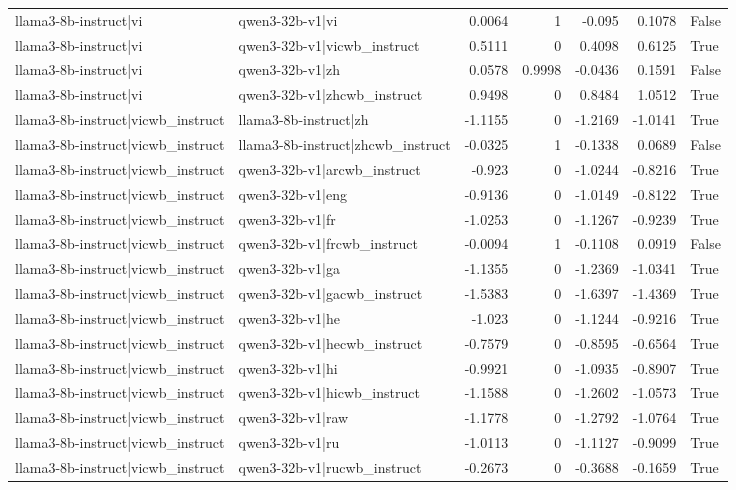 \begin{table}
\begin{tabular}{l l r r r r l}
llama3-8b-instruct|vi & qwen3-32b-v1|vi & 0.0064 & 1 & -0.095 & 0.1078 & False \\
llama3-8b-instruct|vi & qwen3-32b-v1|vicwb_instruct & 0.5111 & 0 & 0.4098 & 0.6125 & True \\
llama3-8b-instruct|vi & qwen3-32b-v1|zh & 0.0578 & 0.9998 & -0.0436 & 0.1591 & False \\
llama3-8b-instruct|vi & qwen3-32b-v1|zhcwb_instruct & 0.9498 & 0 & 0.8484 & 1.0512 & True \\
llama3-8b-instruct|vicwb_instruct & llama3-8b-instruct|zh & -1.1155 & 0 & -1.2169 & -1.0141 & True \\
llama3-8b-instruct|vicwb_instruct & llama3-8b-instruct|zhcwb_instruct & -0.0325 & 1 & -0.1338 & 0.0689 & False \\
llama3-8b-instruct|vicwb_instruct & qwen3-32b-v1|arcwb_instruct & -0.923 & 0 & -1.0244 & -0.8216 & True \\
llama3-8b-instruct|vicwb_instruct & qwen3-32b-v1|eng & -0.9136 & 0 & -1.0149 & -0.8122 & True \\
llama3-8b-instruct|vicwb_instruct & qwen3-32b-v1|fr & -1.0253 & 0 & -1.1267 & -0.9239 & True \\
llama3-8b-instruct|vicwb_instruct & qwen3-32b-v1|frcwb_instruct & -0.0094 & 1 & -0.1108 & 0.0919 & False \\
llama3-8b-instruct|vicwb_instruct & qwen3-32b-v1|ga & -1.1355 & 0 & -1.2369 & -1.0341 & True \\
llama3-8b-instruct|vicwb_instruct & qwen3-32b-v1|gacwb_instruct & -1.5383 & 0 & -1.6397 & -1.4369 & True \\
llama3-8b-instruct|vicwb_instruct & qwen3-32b-v1|he & -1.023 & 0 & -1.1244 & -0.9216 & True \\
llama3-8b-instruct|vicwb_instruct & qwen3-32b-v1|hecwb_instruct & -0.7579 & 0 & -0.8595 & -0.6564 & True \\
llama3-8b-instruct|vicwb_instruct & qwen3-32b-v1|hi & -0.9921 & 0 & -1.0935 & -0.8907 & True \\
llama3-8b-instruct|vicwb_instruct & qwen3-32b-v1|hicwb_instruct & -1.1588 & 0 & -1.2602 & -1.0573 & True \\
llama3-8b-instruct|vicwb_instruct & qwen3-32b-v1|raw & -1.1778 & 0 & -1.2792 & -1.0764 & True \\
llama3-8b-instruct|vicwb_instruct & qwen3-32b-v1|ru & -1.0113 & 0 & -1.1127 & -0.9099 & True \\
llama3-8b-instruct|vicwb_instruct & qwen3-32b-v1|rucwb_instruct & -0.2673 & 0 & -0.3688 & -0.1659 & True \\

\end{tabular}
\end{table}
